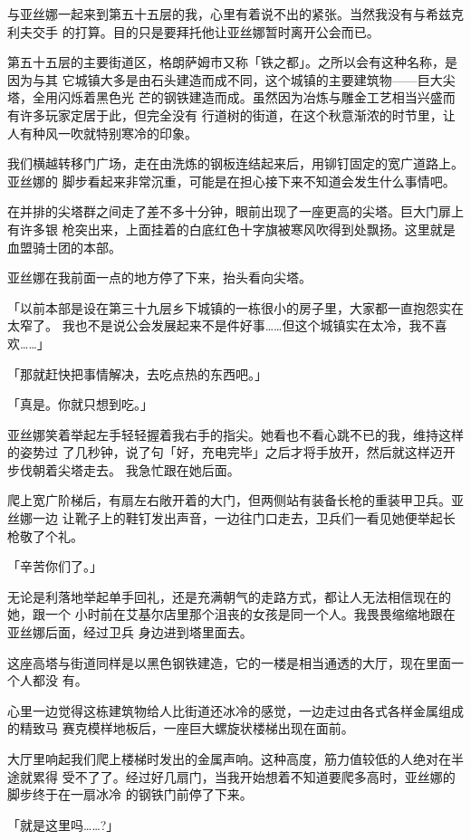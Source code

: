 \documentclass[11pt]{book}
\begin{document}
与亚丝娜一起来到第五十五层的我，心里有着说不出的紧张。当然我没有与希兹克利夫交手
的打算。目的只是要拜托他让亚丝娜暂时离开公会而已。

第五十五层的主要街道区，格朗萨姆市又称「铁之都」。之所以会有这种名称，是因为与其
它城镇大多是由石头建造而成不同，这个城镇的主要建筑物——巨大尖塔，全用闪烁着黑色光
芒的钢铁建造而成。虽然因为冶炼与雕金工艺相当兴盛而有许多玩家定居于此，但完全没有
行道树的街道，在这个秋意渐浓的时节里，让人有种风一吹就特别寒冷的印象。

我们横越转移门广场，走在由洗炼的钢板连结起来后，用铆钉固定的宽广道路上。亚丝娜的
脚步看起来非常沉重，可能是在担心接下来不知道会发生什么事情吧。

在并排的尖塔群之间走了差不多十分钟，眼前出现了一座更高的尖塔。巨大门扉上有许多银
枪突出来，上面挂着的白底红色十字旗被寒风吹得到处飘扬。这里就是血盟骑士团的本部。

亚丝娜在我前面一点的地方停了下来，抬头看向尖塔。

「以前本部是设在第三十九层乡下城镇的一栋很小的房子里，大家都一直抱怨实在太窄了。
我也不是说公会发展起来不是件好事……但这个城镇实在太冷，我不喜欢……」

「那就赶快把事情解决，去吃点热的东西吧。」

「真是。你就只想到吃。」

亚丝娜笑着举起左手轻轻握着我右手的指尖。她看也不看心跳不已的我，维持这样的姿势过
了几秒钟，说了句「好，充电完毕」之后才将手放开，然后就这样迈开步伐朝着尖塔走去。
我急忙跟在她后面。

爬上宽广阶梯后，有扇左右敞开着的大门，但两侧站有装备长枪的重装甲卫兵。亚丝娜一边
让靴子上的鞋钉发出声音，一边往门口走去，卫兵们一看见她便举起长枪敬了个礼。

「辛苦你们了。」

无论是利落地举起单手回礼，还是充满朝气的走路方式，都让人无法相信现在的她，跟一个
小时前在艾基尔店里那个沮丧的女孩是同一个人。我畏畏缩缩地跟在亚丝娜后面，经过卫兵
身边进到塔里面去。

这座高塔与街道同样是以黑色钢铁建造，它的一楼是相当通透的大厅，现在里面一个人都没
有。

心里一边觉得这栋建筑物给人比街道还冰冷的感觉，一边走过由各式各样金属组成的精致马
赛克模样地板后，一座巨大螺旋状楼梯出现在面前。

大厅里响起我们爬上楼梯时发出的金属声响。这种高度，筋力值较低的人绝对在半途就累得
受不了了。经过好几扇门，当我开始想着不知道要爬多高时，亚丝娜的脚步终于在一扇冰冷
的钢铁门前停了下来。

「就是这里吗……?」
\end{document}
